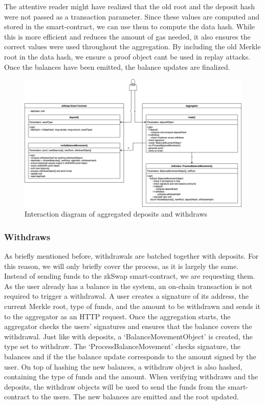 \documentclass[../../thesis.tex]{subfiles}
\begin{document}
The attentive reader might have realized that the old root and the deposit hash were not passed as a transaction parameter. Since these values are computed and stored in the smart-contract, we can use them to compute the data hash. While this is more efficient and reduces the amount of gas needed, it also ensures the correct values were used throughout the aggregation. By including the old Merkle root in the data hash, we ensure a proof object cant be used in replay attacks. Once the balances have been emitted, the balance updates are finalized. 

\begin{figure}[h]
    \centerline{\includegraphics[totalheight=9cm]{diagrams/depositWithdrawAggregated.png}}
    \caption{Interaction diagram of aggregated deposits and withdraws}
    \label{fig:depWithAggr}
\end{figure}

\subsubsection{Withdraws} \label{with}
As briefly mentioned before, withdrawals are batched together with deposits. For this reason, we will only briefly cover the process, as it is largely the same. Instead of sending funds to the zkSwap smart-contract, we are requesting them. As the user already has a balance in the system, an on-chain transaction is not required to trigger a withdrawal. A user creates a signature of its address, the current Merkle root, type of funds, and the amount to be withdrawn and sends it to the aggregator as an HTTP request. Once the aggregation starts, the aggregator checks the users' signatures and ensures that the balance covers the withdrawal. Just like with deposits, a `BalanceMovementObject' is created, the type set to withdraw. The `ProcessBalanceMovement' checks signature, the balances and if the the balance update corresponds to the amount signed by the user. On top of hashing the new balances, a withdraw object is also hashed, containing the type of funds and the amount. When verifying withdraws and the deposits, the withdraw objects will be used to send the funds from the smart-contract to the users. The new balances are emitted and the root updated. 
\end{document}
